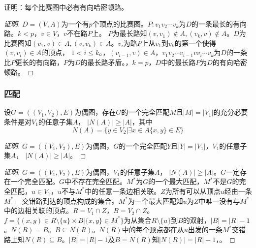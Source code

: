 \documentclass{beamer}
\begin{document}
\begin{CJK*}{UTF8}{gbsn}
\begin{frame}
\end{frame}
\begin{frame}
  \begin{Exercise}
  证明：每个比赛图中必有有向哈密顿路。
  \end{Exercise}
  \begin{proof}[证明]\justifying\let\raggedright\justifying
   $D=(V,A)$为一个有$p$个顶点的比赛图。$P:v_1v_2\cdots v_k$为$D$的一条最长的有向路。$k<p$，$v\in V$，\pause$v$不在路$P$上。
   $P$为最长路知$(v,v_1)\notin A,(v_k,v)\notin A$。$D$为比赛图知$(v_1,v)\in A, (v,v_k)\in A$。$v_i$为路$P$上从$v_1$到$v_k$的第一个使得$(v,v_i)\in A$的顶点，
   $1<i\leq k$。，\pause$(v_{i-1},v)\in A$，$v_1v_2\cdots v_{i-1}vv_{i}\cdots v_k$为$D$的一条比$P$更长的有向路，$P$为$D$的最长路矛盾。，\pause$k=p$，$D$中的最长路$P$为$D$的有向哈密顿路。
  \end{proof}
\end{frame}
\begin{frame}[t]
  \frametitle{匹配}
  \begin{Thm}\justifying\let\raggedright\justifying
    设$G=((V_1,V_2),E)$为偶图，存在$G$的一个完全匹配$M$且$|M| = |V_1|$的充分必要条件是对$V_1$的任意子集$A$， $|N(A)| \geq |A|$，其中\[N(A) = \{y\in V_2|\exists x \in A \{x,y\} \in E\}\]
  \end{Thm}\pause
  \begin{proof}[证明]
\justifying\let\raggedright\justifying
{}$G=((V_1,V_2),E)$为偶图，$G$的一个完全匹配$Y$且$|Y| = |V_1|$，$V_1$的任意子集$A$， \pause$|N(A)| \geq |A|$。
    \renewcommand{\qedsymbol}{}    
\end{proof}  
\end{frame}
\begin{frame}
  \begin{proof}[证明]\justifying\let\raggedright\justifying
    $G=((V_1,V_2),E)$为偶图，$V_1$的任意子集$A$， \pause$|N(A)| \geq |A|$。$G$一定存在一个完全匹配。$G$中不存在完全匹配。$M^*$为$G$的一个最大匹配，$M^*$不是$G$的完全匹配，$u\in V_1$，\pause$u$不与$M^*$中的任意一条边相关联。$Z$为所有可以从顶点$u$经由一条$M^*-$交错路到达的顶点构成的集合。$M^*$为一个最大匹配知$u$为$Z$中唯一没有与$M^*$中的边相关联的顶点。$R=V_1\cap Z$，\pause$B=V_2\cap Z$。$f=\{(x,y)\in R\setminus \{u\}\times B | \{x,y\}\in M^*\}$为从集合$R\setminus \{u\}$到$B$的双射，$|B|=|R|-1$。$N(R)=B$。$B\subseteq N(R)$。$N(R)$中的每个顶点都在从$u$出发的一条$M^*$交错路上知$N(R)\subseteq B$。$|B|=|R|-1$及$B= N(R)$知$|N(R)|=|R|-1$，。
  \end{proof}
\end{frame}


\end{CJK*}
\end{document}

